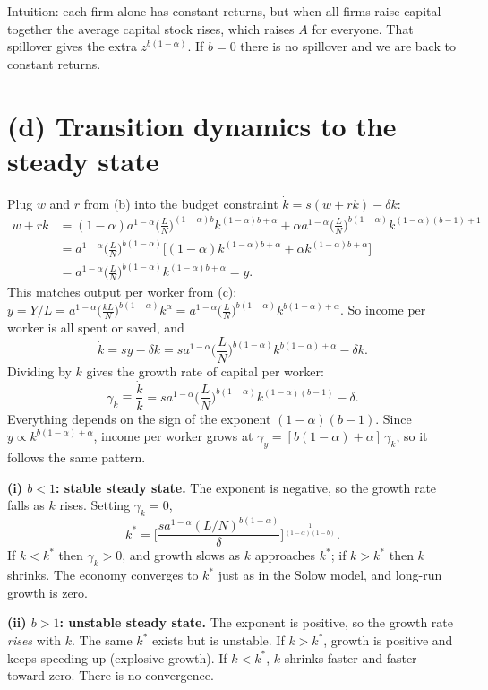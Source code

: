 \documentclass[11pt]{article}
\begin{document}
Intuition: each firm alone has constant returns, but when all firms raise capital together the
average capital stock rises, which raises $A$ for everyone. That spillover gives the extra
$z^{b(1-\alpha)}$. If $b=0$ there is no spillover and we are back to constant returns.

\section*{(d) Transition dynamics to the steady state}

Plug $w$ and $r$ from (b) into the budget constraint $\dot k = s(w+rk)-\delta k$:
\begin{align*}
w + rk &= (1-\alpha)a^{1-\alpha}\Big(\frac{L}{N}\Big)^{(1-\alpha)b}k^{(1-\alpha)b+\alpha}
        + \alpha a^{1-\alpha}\Big(\frac{L}{N}\Big)^{b(1-\alpha)}k^{(1-\alpha)(b-1)+1} \\
       &= a^{1-\alpha}\Big(\frac{L}{N}\Big)^{b(1-\alpha)}
          \Big[(1-\alpha)k^{(1-\alpha)b+\alpha} + \alpha k^{(1-\alpha)b+\alpha}\Big] \\
       &= a^{1-\alpha}\Big(\frac{L}{N}\Big)^{b(1-\alpha)}k^{(1-\alpha)b+\alpha} = y .
\end{align*}
This matches output per worker from (c):
$y = Y/L = a^{1-\alpha}\big(\frac{kL}{N}\big)^{b(1-\alpha)}k^{\alpha}
     = a^{1-\alpha}\big(\frac{L}{N}\big)^{b(1-\alpha)}k^{b(1-\alpha)+\alpha}$.
So income per worker is all spent or saved, and
\[
\dot k = s y - \delta k = s a^{1-\alpha}\Big(\frac{L}{N}\Big)^{b(1-\alpha)}k^{b(1-\alpha)+\alpha} - \delta k .
\]
Dividing by $k$ gives the growth rate of capital per worker:
\[
\gamma_k \equiv \frac{\dot k}{k}
 = s a^{1-\alpha}\Big(\frac{L}{N}\Big)^{b(1-\alpha)}k^{(1-\alpha)(b-1)} - \delta .
\]
Everything depends on the sign of the exponent $(1-\alpha)(b-1)$. Since $y \propto k^{b(1-\alpha)+\alpha}$,
income per worker grows at $\gamma_y = [b(1-\alpha)+\alpha]\,\gamma_k$, so it follows the same pattern.

\textbf{(i) $b<1$: stable steady state.} The exponent is negative, so the growth rate falls as $k$
rises. Setting $\gamma_k=0$,
\[
k^* = \bigg[\frac{s a^{1-\alpha}(L/N)^{b(1-\alpha)}}{\delta}\bigg]^{\frac{1}{(1-\alpha)(1-b)}} .
\]
If $k<k^*$ then $\gamma_k>0$, and growth slows as $k$ approaches $k^*$; if $k>k^*$ then $k$ shrinks.
The economy converges to $k^*$ just as in the Solow model, and long-run growth is zero.

\textbf{(ii) $b>1$: unstable steady state.} The exponent is positive, so the growth rate
\emph{rises} with $k$. The same $k^*$ exists but is unstable. If $k>k^*$, growth is positive and keeps
speeding up (explosive growth). If $k<k^*$, $k$ shrinks faster and faster toward zero.
There is no convergence.
\end{document}
